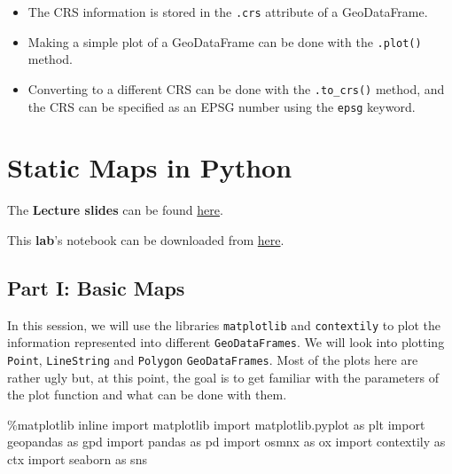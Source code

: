 \documentclass[
  letterpaper,
  DIV=11,
  numbers=noendperiod]{scrreprt}
\newenvironment{Shaded}{\begin{snugshade}}{\end{snugshade}}
\newcommand{\ImportTok}[1]{\textcolor[rgb]{0.00,0.46,0.62}{#1}}
\newcommand{\NormalTok}[1]{\textcolor[rgb]{0.00,0.23,0.31}{#1}}
\newcommand{\OperatorTok}[1]{\textcolor[rgb]{0.37,0.37,0.37}{#1}}
\providecommand{\tightlist}{%
  \setlength{\itemsep}{0pt}\setlength{\parskip}{0pt}}\usepackage{longtable,booktabs,array}
\begin{document}
\begin{itemize}
\tightlist
\item
  The CRS information is stored in the \texttt{.crs} attribute of a
  GeoDataFrame.
\item
  Making a simple plot of a GeoDataFrame can be done with the
  \texttt{.plot()} method.
\item
  Converting to a different CRS can be done with the \texttt{.to\_crs()}
  method, and the CRS can be specified as an EPSG number using the
  \texttt{epsg} keyword.
\end{itemize}


\hypertarget{static-maps-in-python}{%
\chapter{Static Maps in Python}\label{static-maps-in-python}}

The \textbf{Lecture slides} can be found
\href{https://github.com/GDSL-UL/wma/blob/main/lectures/w02.pdf}{here}.

This \textbf{lab}'s notebook can be downloaded from
\href{https://github.com/GDSL-UL/wma/blob/main/labs/w02_maps.ipynb}{here}.

\hypertarget{part-i-basic-maps}{%
\section{Part I: Basic Maps}\label{part-i-basic-maps}}

In this session, we will use the libraries \texttt{matplotlib} and
\texttt{contextily} to plot the information represented into different
\texttt{GeoDataFrames}. We will look into plotting \texttt{Point},
\texttt{LineString} and \texttt{Polygon} \texttt{GeoDataFrames}. Most of
the plots here are rather ugly but, at this point, the goal is to get
familiar with the parameters of the plot function and what can be done
with them.

\begin{Shaded}
\begin{Highlighting}[]
\OperatorTok{\%}\NormalTok{matplotlib inline}
\ImportTok{import}\NormalTok{ matplotlib}
\ImportTok{import}\NormalTok{ matplotlib.pyplot }\ImportTok{as}\NormalTok{ plt}
\ImportTok{import}\NormalTok{ geopandas }\ImportTok{as}\NormalTok{ gpd}
\ImportTok{import}\NormalTok{ pandas }\ImportTok{as}\NormalTok{ pd}
\ImportTok{import}\NormalTok{ osmnx }\ImportTok{as}\NormalTok{ ox}
\ImportTok{import}\NormalTok{ contextily }\ImportTok{as}\NormalTok{ ctx}
\ImportTok{import}\NormalTok{ seaborn }\ImportTok{as}\NormalTok{ sns}
\end{Highlighting}
\end{Shaded}
\end{document}
